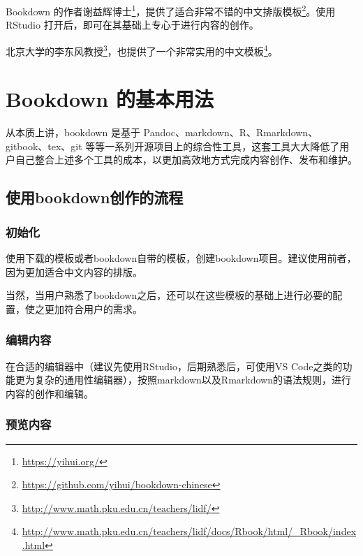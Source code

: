 \documentclass[]{ctexbook}
\renewcommand{\href}[2]{#2\footnote{\url{#1}}}
\begin{document}
Bookdown 的作者\href{https://yihui.org/}{谢益辉博士}，提供了适合非常\href{https://github.com/yihui/bookdown-chinese}{不错的中文排版模板}。使用 RStudio 打开后，即可在其基础上专心于进行内容的创作。

北京大学的\href{http://www.math.pku.edu.cn/teachers/lidf/}{李东风教授}，也提供了一个\href{http://www.math.pku.edu.cn/teachers/lidf/docs/Rbook/html/_Rbook/index.html}{非常实用的中文模板}。

\hypertarget{basic}{%
\chapter{Bookdown 的基本用法}\label{basic}}

从本质上讲，bookdown 是基于 Pandoc、markdown、R、Rmarkdown、gitbook、tex、git 等等一系列开源项目上的综合性工具，这套工具大大降低了用户自己整合上述多个工具的成本，以更加高效地方式完成内容创作、发布和维护。

\hypertarget{ux4f7fux7528bookdownux521bux4f5cux7684ux6d41ux7a0b}{%
\section{使用bookdown创作的流程}\label{ux4f7fux7528bookdownux521bux4f5cux7684ux6d41ux7a0b}}

\hypertarget{ux521dux59cbux5316}{%
\subsection{初始化}\label{ux521dux59cbux5316}}

使用下载的模板或者bookdown自带的模板，创建bookdown项目。建议使用前者，因为更加适合中文内容的排版。

当然，当用户熟悉了bookdown之后，还可以在这些模板的基础上进行必要的配置，使之更加符合用户的需求。

\hypertarget{ux7f16ux8f91ux5185ux5bb9}{%
\subsection{编辑内容}\label{ux7f16ux8f91ux5185ux5bb9}}

在合适的编辑器中（建议先使用RStudio，后期熟悉后，可使用VS Code之类的功能更为复杂的通用性编辑器），按照markdown以及Rmarkdown的语法规则，进行内容的创作和编辑。

\hypertarget{ux9884ux89c8ux5185ux5bb9}{%
\subsection{预览内容}\label{ux9884ux89c8ux5185ux5bb9}}
\end{document}
